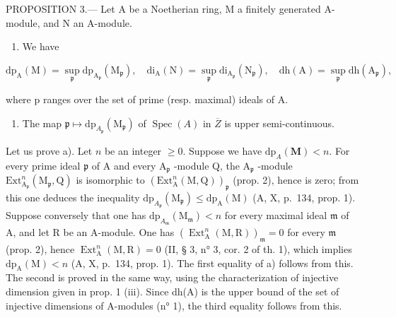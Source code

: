 PROPOSITION 3.--- Let A be a Noetherian ring, M a finitely generated A-module, and N an A-module.

\begin{enumerate}
\def\labelenumi{\alph{enumi})}
\tightlist
\item
  We have
\end{enumerate}

\[
\mathrm{dp} _ {\mathrm{A}} (\mathrm{M}) = \sup _ {\mathfrak {p}} \mathrm{dp} _ {\mathrm{A} _ {\mathfrak {p}}} \left(\mathrm{M} _ {\mathfrak {p}}\right), \quad \mathrm{di} _ {\mathrm{A}} (\mathrm{N}) = \sup _ {\mathfrak {p}} \mathrm{di} _ {\mathrm{A} _ {\mathfrak {p}}} \left(\mathrm{N} _ {\mathfrak {p}}\right), \quad \mathrm{dh} (\mathrm{A}) = \sup _ {\mathfrak {p}} \mathrm{dh} \left(\mathrm{A} _ {\mathfrak {p}}\right),
\]

where p ranges over the set of prime (resp. maximal) ideals of A.

\begin{enumerate}
\def\labelenumi{\alph{enumi})}
\setcounter{enumi}{1}
\tightlist
\item
  The map \(\mathfrak{p} \mapsto \mathrm{dp}_{A_{\mathfrak{p}}}(\mathrm{M}_{\mathfrak{p}})\) of \(\operatorname{Spec}(A)\) in \(\overline{Z}\) is upper semi-continuous.
\end{enumerate}

Let us prove a). Let \(n\) be an integer \(\geqslant 0\). Suppose we have \(\mathrm{dp}_{A}(\mathbf{M}) < n\). For every prime ideal \(\mathfrak{p}\) of A and every \(\mathrm{A}_{\mathfrak{p}}\) -module Q, the \(\mathrm{A}_{\mathfrak{p}}\) -module \(\mathrm{Ext}_{\mathrm{A}_{\mathfrak{p}}}^{n}(\mathrm{M}_{\mathfrak{p}},\mathrm{Q})\) is isomorphic to \((\mathrm{Ext}_{\mathrm{A}}^{n}(\mathrm{M},\mathrm{Q}))_{\mathfrak{p}}\) (prop. 2), hence is zero; from this one deduces the inequality \(\mathrm{dp}_{A_{\mathfrak{p}}}(\mathrm{M}_{\mathfrak{p}}) \leqslant \mathrm{dp}_{\mathrm{A}}(\mathrm{M})\) (A, X, p.~134, prop. 1). Suppose conversely that one has \(\mathrm{dp}_{A_{\mathfrak{m}}}(\mathrm{M}_{\mathfrak{m}}) < n\) for every maximal ideal \(\mathfrak{m}\) of A, and let R be an A-module. One has \((\operatorname{Ext}_{\mathrm{A}}^{n}(\mathrm{M}, \mathrm{R}))_{\mathfrak{m}} = 0\) for every \(\mathfrak{m}\) (prop. 2), hence \(\operatorname{Ext}_{\mathrm{A}}^{n}(\mathrm{M}, \mathrm{R}) = 0\) (II, § 3, n° 3, cor. 2 of th. 1), which implies \(\mathrm{dp}_{\mathrm{A}}(\mathrm{M}) < n\) (A, X, p.~134, prop. 1). The first equality of a) follows from this. The second is proved in the same way, using the characterization of injective dimension given in prop. 1 (iii). Since dh(A) is the upper bound of the set of injective dimensions of A-modules (n° 1), the third equality follows from this.

